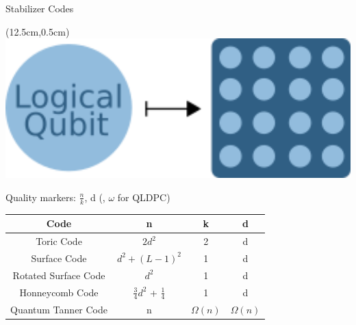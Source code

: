 \documentclass{dfki}
\begin{document}
\begin{frame}{Stabilizer Codes}
	\begin{textblock*}{2.5cm}(12.5cm,0.5cm)
		\includegraphics[width=1\textwidth]{fig/QEC_pure_code.png}
	\end{textblock*}
	Quality markers: $\frac{n}{k}$, d (, $\omega$ for QLDPC)
	\begin{table}[h]
        \renewcommand{\arraystretch}{1.5} %
        \small
		\begin{tabular}{c|c|c|c}
			\textbf{Code} &  \textbf{n} & \textbf{k} & \textbf{d} \\
			\hline
			Toric Code & $2d^{2}$ & 2 & d \\
			Surface Code & $d^{2} + (L-1)^{2}$ &  1 & d \\
			Rotated Surface Code & $d^{2}$ &  1 & d \\
			\pause
			Honneycomb Code \cite{landahl_fault-tolerant_2011} & $\frac{3}{4}d^{2}$ + $\frac{1}{4}$ & 1 & d \\
			\pause
			Quantum Tanner Code & n & $\Omega(n)$ & $\Omega(n)$
		\end{tabular}
	\end{table}
\end{frame}
\end{document}
